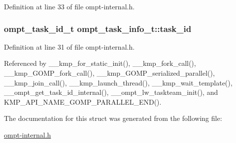 Definition at line 33 of file ompt-\/internal.\-h.

\hypertarget{structompt__task__info__t_a9b45ec47bd1086973892108a3a71e6fe}{
\subsubsection[{task\-\_\-id}]{\setlength{\rightskip}{0pt plus 5cm}ompt\-\_\-task\-\_\-id\-\_\-t ompt\-\_\-task\-\_\-info\-\_\-t\-::task\-\_\-id}}\label{structompt__task__info__t_a9b45ec47bd1086973892108a3a71e6fe}


Definition at line 31 of file ompt-\/internal.\-h.



Referenced by \-\_\-\-\_\-kmp\-\_\-for\-\_\-static\-\_\-init(), \-\_\-\-\_\-kmp\-\_\-fork\-\_\-call(), \-\_\-\-\_\-kmp\-\_\-\-G\-O\-M\-P\-\_\-fork\-\_\-call(), \-\_\-\-\_\-kmp\-\_\-\-G\-O\-M\-P\-\_\-serialized\-\_\-parallel(), \-\_\-\-\_\-kmp\-\_\-join\-\_\-call(), \-\_\-\-\_\-kmp\-\_\-launch\-\_\-thread(), \-\_\-\-\_\-kmp\-\_\-wait\-\_\-template(), \-\_\-\-\_\-ompt\-\_\-get\-\_\-task\-\_\-id\-\_\-internal(), \-\_\-\-\_\-ompt\-\_\-lw\-\_\-taskteam\-\_\-init(), and K\-M\-P\-\_\-\-A\-P\-I\-\_\-\-N\-A\-M\-E\-\_\-\-G\-O\-M\-P\-\_\-\-P\-A\-R\-A\-L\-L\-E\-L\-\_\-\-E\-N\-D().



The documentation for this struct was generated from the following file\-:\begin{DoxyCompactItemize}
\item 
\hyperlink{ompt-internal_8h}{ompt-\/internal.\-h}\end{DoxyCompactItemize}
